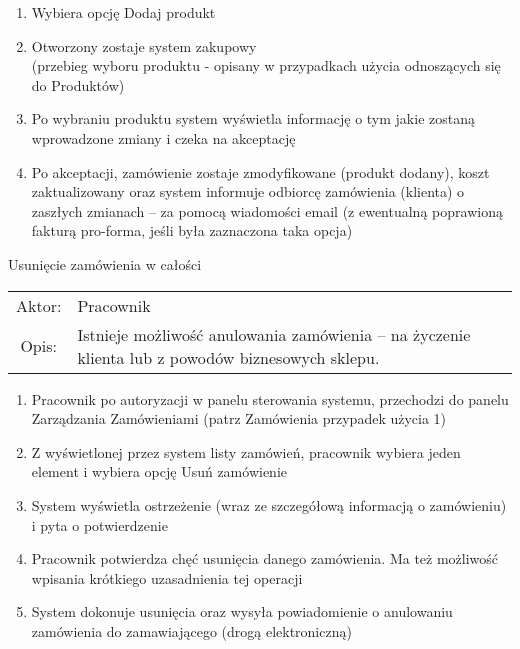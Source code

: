 \begin{enumerate}
\begin{enumerate}
		  \item Wybiera opcję Dodaj produkt
		  \item Otworzony zostaje system zakupowy\\ 
		  (przebieg wyboru produktu - opisany w przypadkach użycia odnoszących się do
		  Produktów)
		  \item Po wybraniu produktu system wyświetla informację o tym jakie zostaną
		  wprowadzone zmiany i czeka na akceptację
		  \item Po akceptacji, zamówienie zostaje zmodyfikowane (produkt dodany),
		  koszt zaktualizowany oraz system informuje odbiorcę zamówienia (klienta) o
		  zaszłych zmianach – za pomocą wiadomości email (z ewentualną poprawioną
		  fakturą pro-forma, jeśli była zaznaczona taka opcja) 
	  \end{enumerate} %
	\end{enumerate} %
	
  \item Usunięcie zamówienia w całości\\
  \begin{tabularx}{\linewidth}{c X}
  Aktor: & Pracownik \\
  Opis: & Istnieje możliwość anulowania zamówienia – na życzenie klienta lub z
  powodów biznesowych sklepu.
  \end{tabularx}  
	\begin{enumerate}
	  \item Pracownik po autoryzacji w panelu sterowania systemu, przechodzi do
	  panelu Zarządzania Zamówieniami (patrz Zamówienia przypadek użycia 1)
	  \item Z wyświetlonej przez system listy zamówień, pracownik wybiera jeden
	  element i wybiera opcję Usuń zamówienie
	  \item System wyświetla ostrzeżenie (wraz ze szczegółową informacją o
	  zamówieniu) i pyta o potwierdzenie
	  \item Pracownik potwierdza chęć usunięcia danego zamówienia. Ma też możliwość
	  wpisania krótkiego uzasadnienia tej operacji
	  \item System dokonuje usunięcia oraz wysyła powiadomienie o anulowaniu
	  zamówienia do zamawiającego (drogą elektroniczną)
	\end{enumerate}

	